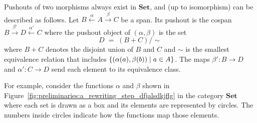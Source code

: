\begin{example}
    \label{ex:cat:posfjsdlkgja}
     Pushouts of two morphisms always exist in \(\mathbf{Set}\), and (up to isomorphism) can be described as follows. Let
    \( B \overset{\alpha}{\leftarrow} A \overset{\beta}{\rightarrow} C \) be a span. Its pushout is the cospan \( B \overset{\beta'}{\rightarrow} D \overset{\alpha'}{\leftarrow} C \) where the pushout object of \((\alpha,\beta)\) is the set
    \[
    D \;=\; (B + C)/{\sim}
    \]
    where \(B + C\) denotes the disjoint union of $B$ and $C$ and \(\sim\) is the smallest equivalence relation that includes \(\{(\alpha(a),\beta(b))\mid a \in A \}\). The maps
    \(\beta' \colon B\to D\) and \(\alpha' \colon C\to D\) send each element to its equivalence class.

    For example, consider the functions \(\alpha\) and \(\beta\) shown in Figure~\ref{fig:preliminaries:a_rewriting_step_dfjalsdkjflg} in the category \(\mathbf{Set}\) where each set is drawn as a box and its elements are represented by circles. The numbers inside circles indicate how the functions map those elements.
    \begin{figure}[H]
      \centering 
\end{figure}
\end{example}

